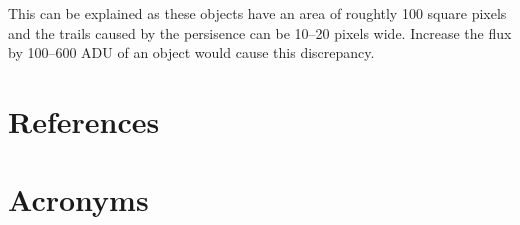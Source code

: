 \documentclass[DM,authoryear,toc]{lsstdoc}
\begin{document}
This can be explained as these objects have an area of roughtly 100 square pixels and the trails caused by the persisence can be 10--20 pixels wide.
Increase the flux by 100--600 ADU of an object would cause this discrepancy.


\appendix
\section{References}\label{sec:bib}
\renewcommand{\refname}{} %


\section{Acronyms}\label{sec:acronyms}

\end{document}
